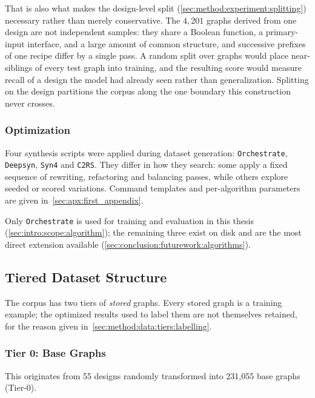 That is also what makes the design-level split
(\ref{sec:method:experiment:splitting}) necessary rather than merely conservative. The
$4{,}201$ graphs derived from one design are not independent samples: they share a Boolean
function, a primary-input interface, and a large amount of common structure, and successive
prefixes of one recipe differ by a single pass. A random split over graphs would place
near-siblings of every test graph into training, and the resulting score would measure recall
of a design the model had already seen rather than generalization. Splitting on the design
partitions the corpus along the one boundary this construction never crosses.


\subsubsection{Optimization}
\label{sec:method:data:generation:algorithms}
Four synthesis scripts were applied during dataset generation: \texttt{Orchestrate},
\texttt{Deepsyn}, \texttt{Syn4} and \texttt{C2RS}. They differ in how they search: some
apply a fixed sequence of rewriting, refactoring and balancing passes, while others explore
seeded or scored variations. Command templates and per-algorithm parameters are given
in~\ref{sec:apx:first_appendix}.

Only \texttt{Orchestrate} is used for training and evaluation in this thesis
(\ref{sec:intro:scope:algorithm}); the remaining three exist on disk and are the most
direct extension available (\ref{sec:conclusion:futurework:algorithms}).

\subsection{Tiered Dataset Structure}
\label{sec:method:data:tiers}
The corpus has two tiers of \emph{stored} graphs. Every stored graph is a training
example; the optimized results used to label them are not themselves retained, for the
reason given in~\ref{sec:method:data:tiers:labelling}.

\subsubsection{Tier 0: Base Graphs}
\label{sec:method:data:tier0}
This originates from 55 designs randomly transformed into 231,055 base graphs (Tier-0).

